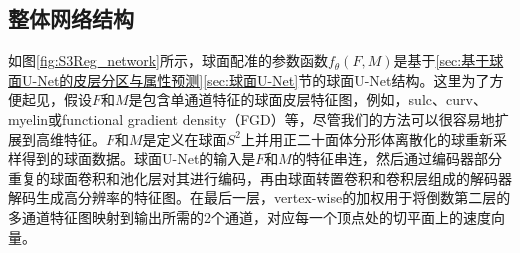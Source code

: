 \subsection{整体网络结构}
如图\ref{fig:S3Reg_network}所示，球面配准的参数函数$f_\theta(F,M)$是基于\ref{sec:基于球面U-Net的皮层分区与属性预测}\ref{sec:球面U-Net}节的球面U-Net结构。这里为了方便起见，假设$F$和$M$是包含单通道特征的球面皮层特征图，例如，sulc、curv、myelin或functional gradient density（FGD）等，尽管我们的方法可以很容易地扩展到高维特征。$F$和$M$是定义在球面$S^2$上并用正二十面体分形体\cite{fischl2012freesurfer}离散化的球重新采样得到的球面数据。球面U-Net的输入是$F$和$M$的特征串连，然后通过编码器部分重复的球面卷积和池化层对其进行编码，再由球面转置卷积和卷积层组成的解码器解码生成高分辨率的特征图。在最后一层，vertex-wise的加权用于将倒数第二层的多通道特征图映射到输出所需的2个通道，对应每一个顶点处的切平面上的速度向量。

